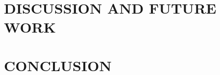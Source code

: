 \documentclass[dissertation,copyright,committeedraft,numbers,sort&compress,gsmodern]{uothesis}
\theoremstyle{definition}
\theoremstyle{definition}
\begin{document}

\chapter{DISCUSSION AND FUTURE WORK}
\label{chap:discussion}



\chapter{CONCLUSION} %
\label{chap:conclusion}



%



\end{document}
